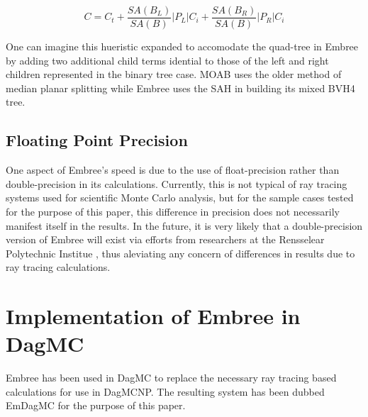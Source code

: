 \documentclass{anstrans}
\begin{document}
\begin{equation} 
C = C_{t} + \frac{SA(B_{L})}{SA(B)} |P_{L}|C_{i} +  \frac{SA(B_{R})}{SA(B)} |P_{R}|C_{i}
\end{equation}

One can imagine this hueristic expanded to accomodate the quad-tree in Embree by adding two additional child terms idential to those of the left and right children represented in the binary tree case. MOAB uses the older method of median planar splitting while Embree uses the SAH in building its mixed BVH4 tree. 

\subsection{Floating Point Precision}

One aspect of Embree's speed is due to the use of float-precision rather than double-precision in its calculations. Currently, this is not typical of ray tracing systems used for scientific Monte Carlo analysis, but for the sample cases tested for the purpose of this paper, this difference in precision does not necessarily manifest itself in the results. In the future, it is very likely that a double-precision version of Embree will exist via efforts from researchers at the Rensselear Polytechnic Institue \cite{gpu_mic_ray_tracing_rpi}, thus aleviating any concern of differences in results due to ray tracing calculations.

\section{Implementation of Embree in DagMC}

Embree has been used in DagMC to replace the necessary ray tracing based calculations for use in DagMCNP. The resulting system has been dubbed EmDagMC for the purpose of this paper. 
\end{document}
